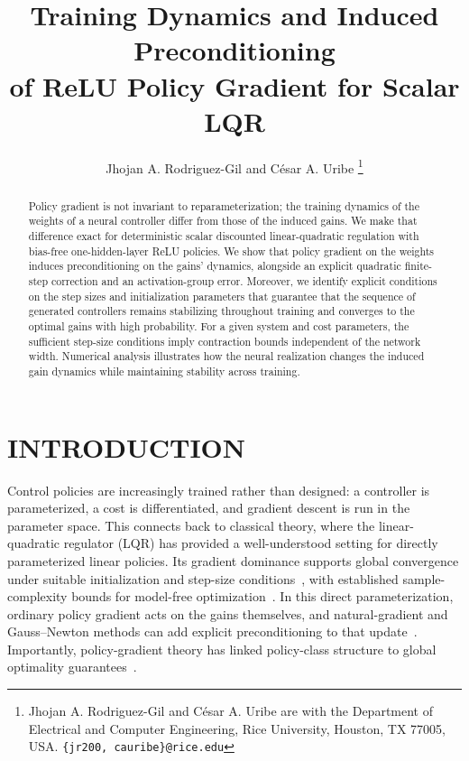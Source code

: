 \documentclass[letterpaper, 10 pt, conference]{ieeeconf}
\begin{document}

\title{\LARGE \bf
Training Dynamics and Induced Preconditioning \\ of ReLU Policy Gradient for Scalar LQR
}

\author{
    Jhojan A. Rodriguez-Gil and C\'esar A. Uribe
    \thanks{
        Jhojan A. Rodriguez-Gil and C\'esar A. Uribe are with the Department of Electrical and Computer Engineering, Rice University, Houston, TX 77005, USA. {\tt\small \{jr200, cauribe\}@rice.edu}
    }
}

\maketitle
\thispagestyle{empty}
\pagestyle{empty}

\begin{abstract}
Policy gradient is not invariant to reparameterization; the training dynamics of the weights of a neural controller differ from those of the induced gains. We make that difference exact for deterministic scalar discounted linear-quadratic regulation with bias-free one-hidden-layer ReLU policies. We show that policy gradient on the weights induces preconditioning on the gains' dynamics, alongside an explicit quadratic finite-step correction and an activation-group error. Moreover, we identify explicit conditions on the step sizes and initialization parameters that guarantee that the sequence of generated controllers remains stabilizing throughout training and converges to the optimal gains with high probability. For a given system and cost parameters, the sufficient step-size conditions imply contraction bounds independent of the network width. Numerical analysis illustrates how the neural realization changes the induced gain dynamics while maintaining stability across training.
\end{abstract}

\section{INTRODUCTION}

Control policies are increasingly trained rather than designed: a controller is parameterized, a cost is differentiated, and gradient descent is run in the parameter space. This connects back to classical theory, where the linear-quadratic regulator (LQR) has provided a well-understood setting for directly parameterized linear policies. Its gradient dominance supports global convergence under suitable initialization and step-size conditions~\cite{fazel2018global,hu2023toward}, with established sample-complexity bounds for model-free optimization~\cite{malik2019derivative,moghaddam2025sample}. In this direct parameterization, ordinary policy gradient acts on the gains themselves, and natural-gradient and Gauss--Newton methods can add explicit preconditioning to that update~\cite{fazel2018global}. Importantly, policy-gradient theory has linked policy-class structure to global optimality guarantees~\cite {agarwal2021theory,bhandari2024global}. 
\end{document}
